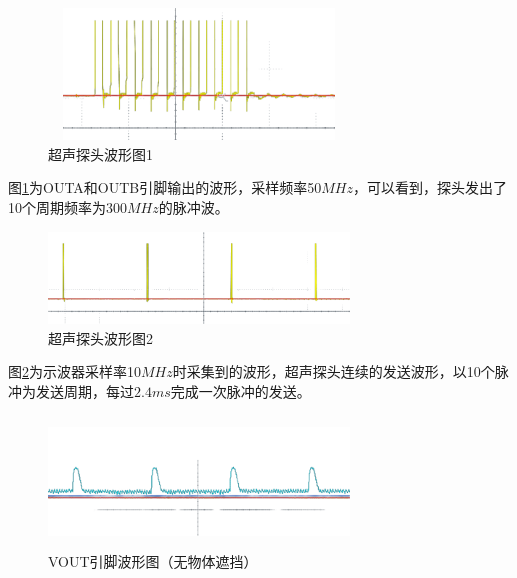 \begin{figure}[!h]
	\centering
	\includegraphics[width=8cm,height=3.5cm]{figure/debug waveform3.png}
	\caption{超声探头波形图1}
	\label{超声探头波形图1}
\end{figure}\par
图\ref{超声探头波形图1}为OUTA和OUTB引脚输出的波形，采样频率50$MHz$，可以看到，探头发出了10个周期频率为300$MHz$的脉冲波。
\begin{figure}[!h]
	\centering
	\includegraphics[width=8cm]{figure/debug waveform4.png}
	\caption{超声探头波形图2}
	\label{超声探头波形图2}
\end{figure}\par
图\ref{超声探头波形图2}为示波器采样率10$MHz$时采集到的波形，超声探头连续的发送波形，以10个脉冲为发送周期，每过$2.4ms$完成一次脉冲的发送。
\newpage
\begin{figure}[!h]
	\centering
	\includegraphics[width=8cm,height=3.5cm]{figure/debug waveform5.png}
	\caption{VOUT引脚波形图（无物体遮挡）}
	\label{VOUT引脚波形图（无物体遮挡）}
\end{figure}\par

